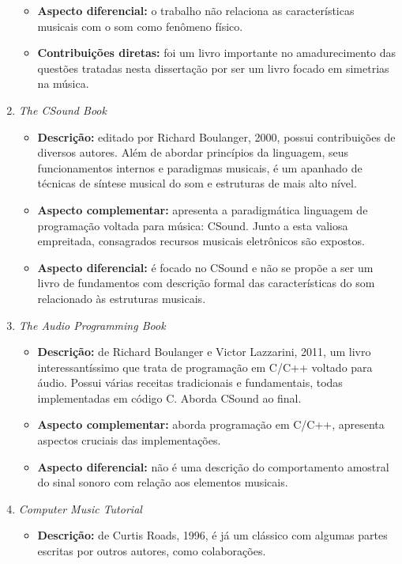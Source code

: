 \begin{enumerate}
\begin{itemize}
            \item {\bf Aspecto diferencial:} o trabalho não relaciona as características musicais com o som como fenômeno físico.
            \item {\bf Contribuições diretas:} foi um livro importante no amadurecimento das questões tratadas nesta dissertação por ser um livro focado em simetrias na música.
        \end{itemize}
    \item \emph{The CSound Book}
        \begin{itemize}
            \item {\bf Descrição:} editado por Richard Boulanger, 2000, possui contribuições de diversos autores. Além de abordar princípios da linguagem, seus funcionamentos internos e paradigmas musicais, é um apanhado de técnicas de síntese musical do som e estruturas de mais alto nível.
            \item {\bf Aspecto complementar:} apresenta a paradigmática linguagem de programação voltada para música: CSound. Junto a esta valiosa empreitada, consagrados recursos musicais eletrônicos são expostos.
            \item {\bf Aspecto diferencial:} é focado no CSound e não se propõe a ser um livro de fundamentos com descrição formal das características do som relacionado às estruturas musicais. 
        \end{itemize}
    \item \emph{The Audio Programming Book}
        \begin{itemize}
            \item {\bf Descrição:} de Richard Boulanger e Victor Lazzarini, 2011, um livro interessantíssimo que trata de programação em C/C++ voltado para áudio. Possui várias receitas tradicionais e fundamentais, todas implementadas em código C. Aborda CSound ao final. 
            \item {\bf Aspecto complementar:} aborda programação em C/C++, apresenta aspectos cruciais das implementações.
            \item {\bf Aspecto diferencial:} não é uma descrição do comportamento amostral do sinal sonoro com relação aos elementos musicais.
        \end{itemize}
    \item \emph{Computer Music Tutorial}
        \begin{itemize}
            \item {\bf Descrição:} de Curtis Roads, 1996, é já um clássico com algumas partes escritas por outros autores, como colaborações. 

\end{itemize}
\end{enumerate}
